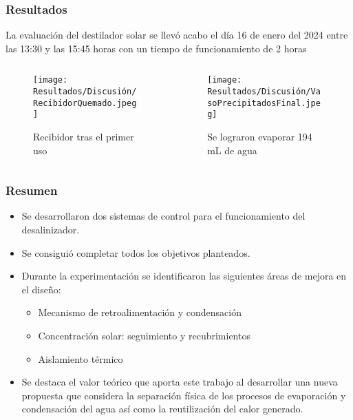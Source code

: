 \begin{frame}
	\frametitle{Resultados}
	
	La evaluación del destilador solar se llevó acabo el día 16 de enero del 2024 entre las 13:30 y las 15:45 horas con un tiempo de funcionamiento de 2 horas
	
	\begin{columns}
		\begin{column}{0.5\linewidth}
			\vfill
			\begin{figure}
				\centering
				\texttt{[image: Resultados/Discusión/RecibidorQuemado.jpeg]}
				\caption{Recibidor tras el primer uso}
			\end{figure}
		\end{column}
		\begin{column}{0.5\linewidth}
			\begin{figure}
				\centering
				\texttt{[image: Resultados/Discusión/VasoPrecipitadosFinal.jpeg]}
				\caption{Se lograron evaporar 194 mL de agua}
			\end{figure}
		\end{column}
	\end{columns}
\end{frame}

\begin{frame}
	\frametitle{Resumen}
	
	\begin{itemize}
		\item Se desarrollaron dos sistemas de control para el funcionamiento del desalinizador.
		\item Se consiguió completar todos los objetivos planteados.
		\item Durante la experimentación se identificaron las siguientes áreas de mejora en el diseño:
			\begin{itemize}
				\item Mecanismo de retroalimentación y condensación
				\item Concentración solar: seguimiento y recubrimientos
				\item Aislamiento térmico
			\end{itemize}
		\item Se destaca el valor teórico que aporta este trabajo al desarrollar una nueva propuesta que considera la separación física de los procesos de evaporación y condensación del agua así como la reutilización del calor generado.
	\end{itemize}	
	
\end{frame}